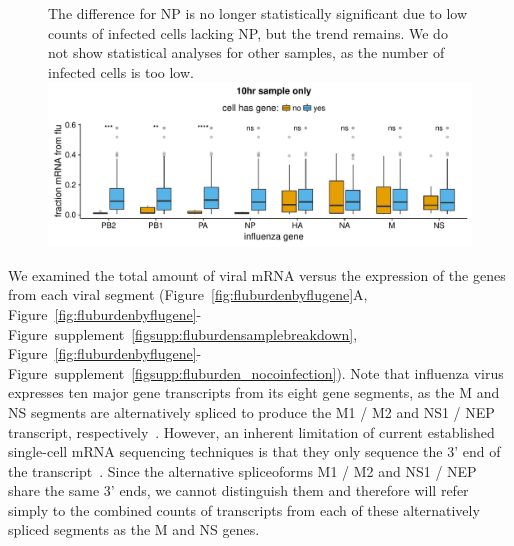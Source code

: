 \documentclass[9pt,lineno]{elife}
\begin{document}
\begin{figure}[t!]
{The difference for NP is no longer statistically significant due to low counts of infected cells lacking NP, but the trend remains.
We do not show statistical analyses for other samples, as the number of infected cells is too low.
}{\includegraphics[width=\linewidth]{figures/p_10hr_flu_burden_flu_gene_test}}
\end{figure}

We examined the total amount of viral mRNA versus the expression of the genes from each viral segment (Figure~\ref{fig:fluburdenbyflugene}A, Figure~\ref{fig:fluburdenbyflugene}-Figure~supplement~\ref{figsupp:fluburdensamplebreakdown}, Figure~\ref{fig:fluburdenbyflugene}-Figure~supplement~\ref{figsupp:fluburden_nocoinfection}). 
Note that influenza virus expresses ten major gene transcripts from its eight gene segments, as the M and NS segments are alternatively spliced to produce the M1 / M2 and NS1 / NEP transcript, respectively~\citep{dubois2014influenza}.
However, an inherent limitation of current established single-cell mRNA sequencing techniques is that they only sequence the 3' end of the transcript~\citep{zheng2017massively,macosko2015highly,Klein:2015ki,cao2017comprehensive}.
Since the alternative spliceoforms M1 / M2 and NS1 / NEP share the same 3' ends, we cannot distinguish them and therefore will refer simply to the combined counts of transcripts from each of these alternatively spliced segments as the M and NS genes.
\end{document}
